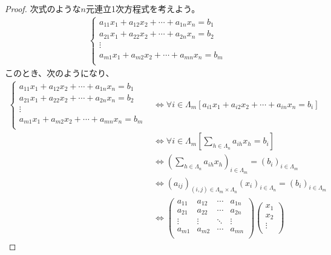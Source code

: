 \documentclass[dvipdfmx]{jsarticle}
\begin{document}
\begin{proof}
次式のような$n$元連立1次方程式を考えよう。
\begin{align*}
\left\{ \begin{matrix}
a_{11}x_{1} + a_{12}x_{2} + \cdots + a_{1n}x_{n} = b_{1} \\
a_{21}x_{1} + a_{22}x_{2} + \cdots + a_{2n}x_{n} = b_{2} \\
 \vdots \\
a_{m1}x_{1} + a_{m2}x_{2} + \cdots + a_{mn}x_{n} = b_{m} \\
\end{matrix} \right.
\end{align*}
このとき、次のようになり、
\begin{align*}
\left\{ \begin{matrix}
a_{11}x_{1} + a_{12}x_{2} + \cdots + a_{1n}x_{n} = b_{1} \\
a_{21}x_{1} + a_{22}x_{2} + \cdots + a_{2n}x_{n} = b_{2} \\
 \vdots \\
a_{m1}x_{1} + a_{m2}x_{2} + \cdots + a_{mn}x_{n} = b_{m} \\
\end{matrix} \right. &\Leftrightarrow \forall i \in \varLambda_{m}\left\lbrack a_{i1}x_{1} + a_{i2}x_{2} + \cdots + a_{in}x_{n} = b_{i} \right\rbrack\\
&\Leftrightarrow \forall i \in \varLambda_{m}\left\lbrack \sum_{h \in \varLambda_{n}} {a_{ih}x_{h}} = b_{i} \right\rbrack\\
&\Leftrightarrow \left( \sum_{h \in \varLambda_{n}} {a_{ih}x_{h}} \right)_{i \in \varLambda_{m}} = \left( b_{i} \right)_{i \in \varLambda_{m}}\\
&\Leftrightarrow \left( a_{ij} \right)_{(i,j) \in \varLambda_{m} \times \varLambda_{n}}\left( x_{i} \right)_{i \in \varLambda_{n}} = \left( b_{i} \right)_{i \in \varLambda_{m}}\\
&\Leftrightarrow \begin{pmatrix}
a_{11} & a_{12} & \cdots & a_{1n} \\
a_{21} & a_{22} & \cdots & a_{2n} \\
 \vdots & \vdots & \ddots & \vdots \\
a_{m1} & a_{m2} & \cdots & a_{mn} \\
\end{pmatrix}\begin{pmatrix}
x_{1} \\
x_{2} \\
 \vdots \\

\end{pmatrix}
\end{align*}
\end{proof}
\end{document}

